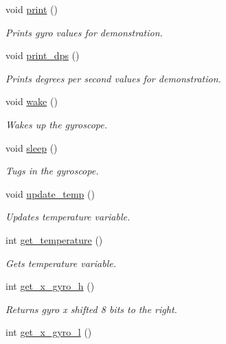 \begin{DoxyCompactItemize}
void \hyperlink{classl3g4200_a9caa7f50a94100706898f049c2bb8d95}{print} ()
\begin{DoxyCompactList}\small\item\em Prints gyro values for demonstration. \end{DoxyCompactList}\item 
void \hyperlink{classl3g4200_a15152a95cc9df7c8e6660c6b62eb48d6}{print\+\_\+dps} ()
\begin{DoxyCompactList}\small\item\em Prints degrees per second values for demonstration. \end{DoxyCompactList}\item 
\mbox{\label{classl3g4200_ae9d09120c93a1fefc53606fed017ff7c}} 
void \hyperlink{classl3g4200_ae9d09120c93a1fefc53606fed017ff7c}{wake} ()
\begin{DoxyCompactList}\small\item\em Wakes up the gyroscope. \end{DoxyCompactList}\item 
void \hyperlink{classl3g4200_a2503f466a114e0b31dffe17e486410fd}{sleep} ()
\begin{DoxyCompactList}\small\item\em Tugs in the gyroscope. \end{DoxyCompactList}\item 
void \hyperlink{classl3g4200_a42255bd4a0fc8b465b0b48d9f853ed74}{update\+\_\+temp} ()
\begin{DoxyCompactList}\small\item\em Updates temperature variable. \end{DoxyCompactList}\item 
int \hyperlink{classl3g4200_ad9a37076877d12182d8e259f81fae966}{get\+\_\+temperature} ()
\begin{DoxyCompactList}\small\item\em Gets temperature variable. \end{DoxyCompactList}\item 
int \hyperlink{classl3g4200_a3afab49f43f0224912363175c1560df4}{get\+\_\+x\+\_\+gyro\+\_\+h} ()
\begin{DoxyCompactList}\small\item\em Returns gyro x shifted 8 bits to the right. \end{DoxyCompactList}\item 
int \hyperlink{classl3g4200_a34b780b136282aa2fdace5daeaadb7ac}{get\+\_\+x\+\_\+gyro\+\_\+l} ()

\end{DoxyCompactItemize}
